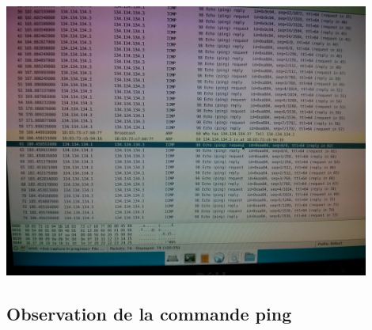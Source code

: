 \documentclass{report}
\begin{document}
\includegraphics[width=12cm]{screen4.jpg}\\

\subsection*{Observation de la commande ping}
\end{document}
